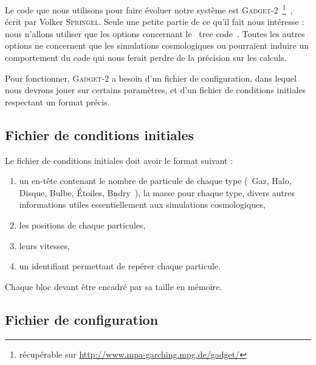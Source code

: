 Le code que nous utilisons pour faire évoluer notre système est \textsc{Gadget-2}~\footnote{récupérable sur \url{http://www.mpa-garching.mpg.de/gadget/}}~\cite{gadget2}, écrit par Volker \textsc{Springel}.
Seule une petite partie de ce qu'il fait nous intéresse : nous n'allons utiliser que les options concernant le \og~tree code~\fg.
Toutes les autres options ne concernent que les simulations cosmologiques ou pourraient
induire un comportement du code qui nous ferait perdre de la précision sur les calculs.

Pour fonctionner, \textsc{Gadget-2} a besoin d'un fichier de configuration, dans lequel nous devrons jouer sur certains paramètres, et d'un fichier de conditions initiales respectant un format précis.

\subsection{Fichier de conditions initiales}

	Le fichier de conditions initiales doit avoir le format suivant :
	\begin{enumerate}
		\item un en-tête contenant le nombre de particule de chaque type (~Gaz, Halo, Disque, Bulbe, Étoiles, Bndry~), la masse pour chaque type, divers autres informations utiles essentiellement aux simulations cosmologiques,
		\item les positions de chaque particules,
		\item leurs vitesses,
		\item un identifiant permettant de repérer chaque particule.
	\end{enumerate}
	Chaque bloc devant être encadré par sa taille en mémoire.

\subsection{Fichier de configuration}


